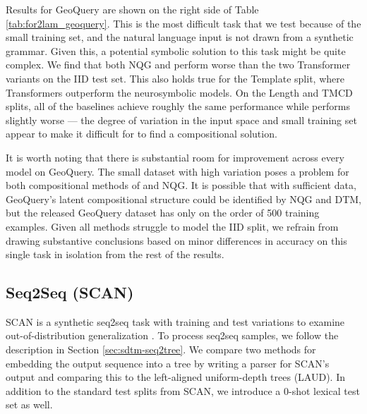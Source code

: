 Results for GeoQuery are shown on the right side of Table \ref{tab:for2lam_geoquery}. This is the most difficult task that we test because of the small training set, and the natural language input is not drawn from a synthetic grammar. Given this, a potential symbolic solution to this task might be quite complex. We find that both NQG and \dtm perform worse than the two Transformer variants on the IID test set. This also holds true for the Template split, where Transformers outperform the neurosymbolic models. On the Length and TMCD splits, all of the baselines achieve roughly the same performance while \dtm performs slightly worse --- the degree of variation in the input space and small training set appear to make it difficult for \sdtm to find a compositional solution. 

It is worth noting that there is substantial room for improvement across every model on GeoQuery. The small dataset with high variation poses a problem for both compositional methods of \sdtm and NQG. It is possible that with sufficient data, GeoQuery's latent compositional structure could be identified by NQG and DTM, but the released GeoQuery dataset has only on the order of 500 training examples. Given all methods struggle to model the IID split, we refrain from drawing substantive conclusions based on minor differences in accuracy on this single task in isolation from the rest of the results. 


\subsection{Seq2Seq (SCAN)} \label{sec:sdtm-scan}
SCAN is a synthetic seq2seq task with training and test variations to examine out-of-distribution generalization \citep{Lake_2018_GeneralizationSystematicityCompositional}. To process seq2seq samples, we follow the description in Section \ref{sec:sdtm-seq2tree}. We compare two methods for embedding the output sequence into a tree by writing a parser for SCAN's output and comparing this to the left-aligned uniform-depth trees (LAUD). In addition to the standard test splits from SCAN, we introduce a 0-shot lexical test set as well.

